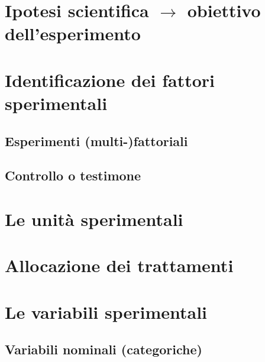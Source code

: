 \documentclass[a4paper,12pt,oneside]{book}
\begin{document}
\hypertarget{ipotesi-scientifica-rightarrow-obiettivo-dellesperimento}{%
\section{\texorpdfstring{Ipotesi scientifica \(\rightarrow\) obiettivo dell'esperimento}{Ipotesi scientifica \textbackslash rightarrow obiettivo dell'esperimento}}\label{ipotesi-scientifica-rightarrow-obiettivo-dellesperimento}}

\hypertarget{identificazione-dei-fattori-sperimentali}{%
\section{Identificazione dei fattori sperimentali}\label{identificazione-dei-fattori-sperimentali}}

\hypertarget{esperimenti-multi-fattoriali}{%
\subsection{Esperimenti (multi-)fattoriali}\label{esperimenti-multi-fattoriali}}

\hypertarget{controllo-o-testimone}{%
\subsection{Controllo o testimone}\label{controllo-o-testimone}}

\hypertarget{le-unituxe0-sperimentali}{%
\section{Le unità sperimentali}\label{le-unituxe0-sperimentali}}

\hypertarget{allocazione-dei-trattamenti}{%
\section{Allocazione dei trattamenti}\label{allocazione-dei-trattamenti}}

\hypertarget{le-variabili-sperimentali}{%
\section{Le variabili sperimentali}\label{le-variabili-sperimentali}}

\hypertarget{variabili-nominali-categoriche}{%
\subsection{Variabili nominali (categoriche)}\label{variabili-nominali-categoriche}}
\end{document}
